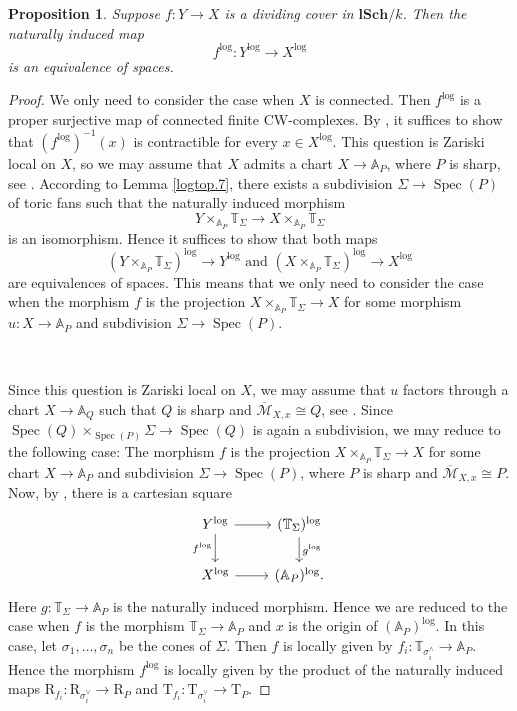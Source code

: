 \documentclass[11pt, a4paper]{amsart}
\newtheorem{prop}[thm]{Proposition}
\theoremstyle{definition}
\numberwithin{equation}{subsection}
\newcommand{\A}{\mathbb{A}}
\newcommand{\T}{\mathbb{T}}
\newcommand{\lSch}{\mathbf{lSch}}
\providecommand{\Spec}[1]{\operatorname{Spec}(#1)} 	%
\newcommand{\ol}{\overline}
\newcommand{\cM}{\mathcal{M}}
\newcommand{\rR}{\mathrm{R}}
\newcommand{\rT}{\mathrm{T}}
\begin{document}
\begin{prop}
\label{KNreal.4}
Suppose $f\colon Y\to X$ is a dividing cover in $\lSch/k$.
Then the naturally induced map
\[
f^{\log}
\colon
Y^{\log}
\to
X^{\log}
\]
is an equivalence of spaces.
\end{prop}
\begin{proof}
We only need to consider the case when $X$ is connected.
Then $f^{\log}$ is a proper surjective map of connected finite CW-complexes.
By \cite{zbMATH03146521}, 
it suffices to show that $(f^{\log})^{-1}(x)$ is contractible for every $x\in X^{\log}$.
This question is Zariski local on $X$, 
so we may assume that $X$ admits a chart $X\to \A_P$, 
where $P$ is sharp, 
see \cite[Proposition II.2.3.7]{Ogu}.
According to Lemma \ref{logtop.7}, 
there exists a subdivision $\Sigma\to \Spec{P}$ of toric fans such that the naturally induced morphism
\[
Y\times_{\A_P}\T_\Sigma
\to
X\times_{\A_P}\T_\Sigma
\]
is an isomorphism.
Hence it suffices to show that both maps
\[
(Y\times_{\A_P}\T_\Sigma)^{\log}\to Y^{\log}
\text{ and }
(X\times_{\A_P}\T_\Sigma)^{\log}\to X^{\log}
\]
are equivalences of spaces.
This means that we only need to consider the case when the morphism $f$ is the projection $X\times_{\A_P}\T_\Sigma\to X$ 
for some morphism $u\colon X\to \A_P$ and subdivision $\Sigma\to \Spec{P}$.

\ 

Since this question is Zariski local on $X$, 
we may assume that $u$ factors through a chart $X\to \A_Q$ such that $Q$ is sharp and $\ol{\cM}_{X,x}\cong Q$, 
see \cite[Proposition II.2.3.7]{Ogu}.
Since $\Spec{Q}\times_{\Spec{P}}\Sigma\to \Spec{Q}$ is again a subdivision, 
we may reduce to the following case:
The morphism $f$ is the projection $X\times_{\A_P}\T_\Sigma\to X$ for some chart $X\to \A_P$ and subdivision 
$\Sigma\to \Spec{P}$, where $P$ is sharp and $\ol{\cM}_{X,x}\cong P$.
Now, 
by \cite[Lemma 1.3]{MR1700591}, 
there is a cartesian square
\[
\begin{tikzcd}
Y^{\log}\ar[d,"f^{\log}"']\ar[r]&
(\T_\Sigma)^{\log}\ar[d,"g^{\log}"]
\\
X^{\log}\ar[r]&
(\A_P)^{\log}.
\end{tikzcd}
\]
Here $g\colon \T_\Sigma\to \A_P$ is the naturally induced morphism.
Hence we are reduced to the case when $f$ is the morphism $\T_\Sigma\to \A_P$ and $x$ is the origin of $(\A_P)^{\log}$.
In this case, 
let $\sigma_1,\ldots,\sigma_n$ be the cones of $\Sigma$.
Then $f$ is locally given by $f_i\colon \T_{\sigma_i^\wedge}\to \A_P$.
Hence the morphism $f^{\log}$ is locally given by the product of the naturally induced maps 
$\rR_{f_i}\colon \rR_{\sigma_i^\vee}\to \rR_P$ and $\rT_{f_i}\colon \rT_{\sigma_i^\vee}\to \rT_P$.


\end{proof}
\end{document}
